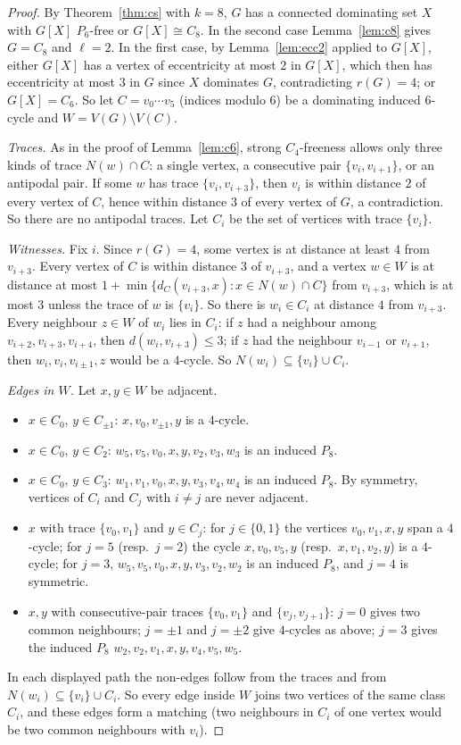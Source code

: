 \documentclass[11pt]{amsart}
\theoremstyle{definition}
\theoremstyle{remark}
\newcommand{\lr}{\ell}
\begin{document}
\begin{proof}
By Theorem~\ref{thm:cs} with $k=8$, $G$ has a connected dominating set $X$ with $G[X]$ $P_6$-free or $G[X]\cong C_8$. In the second case Lemma~\ref{lem:c8} gives $G=C_8$ and $\lr=2$. In the first case, by Lemma~\ref{lem:ecc2} applied to $G[X]$, either $G[X]$ has a vertex of eccentricity at most $2$ in $G[X]$, which then has eccentricity at most $3$ in $G$ since $X$ dominates $G$, contradicting $r(G)=4$; or $G[X]=C_6$. So let $C=v_0\cdots v_5$ (indices modulo $6$) be a dominating induced $6$-cycle and $W=V(G)\setminus V(C)$.

\emph{Traces.} As in the proof of Lemma~\ref{lem:c6}, strong $C_4$-freeness allows only three kinds of trace $N(w)\cap C$: a single vertex, a consecutive pair $\{v_i,v_{i+1}\}$, or an antipodal pair. If some $w$ has trace $\{v_i,v_{i+3}\}$, then $v_i$ is within distance $2$ of every vertex of $C$, hence within distance $3$ of every vertex of $G$, a contradiction. So there are no antipodal traces. Let $C_i$ be the set of vertices with trace $\{v_i\}$.

\emph{Witnesses.} Fix $i$. Since $r(G)=4$, some vertex is at distance at least $4$ from $v_{i+3}$. Every vertex of $C$ is within distance $3$ of $v_{i+3}$, and a vertex $w\in W$ is at distance at most $1+\min\{d_C(v_{i+3},x):x\in N(w)\cap C\}$ from $v_{i+3}$, which is at most $3$ unless the trace of $w$ is $\{v_i\}$. So there is $w_i\in C_i$ at distance $4$ from $v_{i+3}$. Every neighbour $z\in W$ of $w_i$ lies in $C_i$: if $z$ had a neighbour among $v_{i+2},v_{i+3},v_{i+4}$, then $d(w_i,v_{i+3})\le3$; if $z$ had the neighbour $v_{i-1}$ or $v_{i+1}$, then $w_i,v_i,v_{i\pm1},z$ would be a $4$-cycle. So $N(w_i)\subseteq\{v_i\}\cup C_i$.

\emph{Edges in $W$.} Let $x,y\in W$ be adjacent.
\begin{itemize}
\item $x\in C_0$, $y\in C_{\pm1}$: $x,v_0,v_{\pm1},y$ is a $4$-cycle.
\item $x\in C_0$, $y\in C_2$: $w_5,v_5,v_0,x,y,v_2,v_3,w_3$ is an induced $P_8$.
\item $x\in C_0$, $y\in C_3$: $w_1,v_1,v_0,x,y,v_3,v_4,w_4$ is an induced $P_8$. By symmetry, vertices of $C_i$ and $C_j$ with $i\ne j$ are never adjacent.
\item $x$ with trace $\{v_0,v_1\}$ and $y\in C_j$: for $j\in\{0,1\}$ the vertices $v_0,v_1,x,y$ span a $4$-cycle; for $j=5$ (resp.\ $j=2$) the cycle $x,v_0,v_5,y$ (resp.\ $x,v_1,v_2,y$) is a $4$-cycle; for $j=3$, $w_5,v_5,v_0,x,y,v_3,v_2,w_2$ is an induced $P_8$, and $j=4$ is symmetric.
\item $x,y$ with consecutive-pair traces $\{v_0,v_1\}$ and $\{v_j,v_{j+1}\}$: $j=0$ gives two common neighbours; $j=\pm1$ and $j=\pm2$ give $4$-cycles as above; $j=3$ gives the induced $P_8$ $w_2,v_2,v_1,x,y,v_4,v_5,w_5$.
\end{itemize}
In each displayed path the non-edges follow from the traces and from $N(w_i)\subseteq\{v_i\}\cup C_i$. So every edge inside $W$ joins two vertices of the same class $C_i$, and these edges form a matching (two neighbours in $C_i$ of one vertex would be two common neighbours with $v_i$).


\end{proof}
\end{document}
